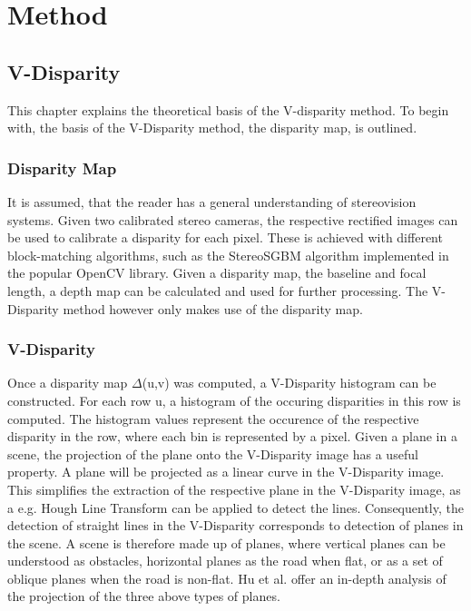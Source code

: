 
\chapter{Method}
\label{chp:Method}

\section{V-Disparity}

This chapter explains the theoretical basis of the V-disparity method. To begin with, the basis of the V-Disparity method, the disparity map, is outlined.

\subsection{Disparity Map} \label{sbs:method_dispmap}
It is assumed, that the reader has a general understanding of stereovision systems. Given two calibrated stereo cameras, the respective rectified images can be used to calibrate a disparity for each pixel. These is achieved with different block-matching algorithms, such as the StereoSGBM algorithm implemented in the popular OpenCV library. Given a disparity map, the baseline and focal length, a depth map can be calculated and used for further processing. The V-Disparity method however only makes use of the disparity map.



\subsection{V-Disparity}

Once a disparity map $\Delta$(u,v) was computed, a V-Disparity histogram can be constructed. For each row u, a histogram of the occuring disparities in this row is computed. The histogram values represent the occurence of the respective disparity in the row, where each bin is represented by a pixel. Given a plane in a scene, the projection of the plane onto the V-Disparity image has a useful property. 
A plane will be projected as a linear curve in the V-Disparity image. This simplifies the extraction of the respective plane in the V-Disparity image, as a e.g. Hough Line Transform can be applied to detect the lines. Consequently, the detection of straight lines in the V-Disparity corresponds to detection of planes in the scene.
A scene is therefore made up of planes, where vertical planes can be understood as obstacles, horizontal planes as the road when flat, or as a set of oblique planes when the road is non-flat. Hu et al. \cite{Hu2005} offer an in-depth analysis of the projection of the three above types of planes.

